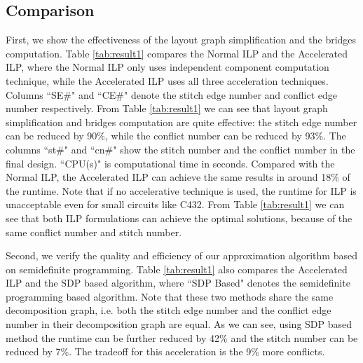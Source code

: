 \documentclass[10pt,conference]{IEEEtran}
\begin{document}
\subsection{Comparison}

First, we show the effectiveness of the layout graph simplification and the bridges computation.
Table \ref{tab:result1} compares the Normal ILP and the Accelerated ILP, where the Normal ILP only uses independent component computation technique, while the Accelerated ILP uses all three acceleration techniques.
Columns ``SE\#" and ``CE\#" denote the stitch edge number and conflict edge number respectively.
From Table \ref{tab:result1} we can see that layout graph simplification and bridges computation are quite effective:
the stitch edge number can be reduced by 90\%, while the conflict number can be reduced by 93\%.
The columns ``st\#" and  ``cn\#" show the stitch number and the conflict number in the final design.
``CPU(s)" is computational time in seconds.
Compared with the Normal ILP, the Accelerated ILP can achieve the same results in around 18\% of the runtime.
Note that if no accelerative technique is used, the runtime for ILP is unacceptable even for small circuits like C432. 
From Table \ref{tab:result1} we can see that both ILP formulations can achieve the optimal solutions, because of the same conflict number and stitch number. 

Second, we verify the quality and efficiency of our approximation algorithm based on semidefinite programming.
Table \ref{tab:result1} also compares the Accelerated ILP and the SDP based algorithm, where ``SDP Based" denotes the semidefinite programming based algorithm.
Note that these two methods share the same decomposition graph, i.e. both the stitch edge number and the conflict edge number in their decomposition graph are equal.
As we can see, using SDP based method the runtime can be further reduced by 42\% and the stitch number can be reduced by 7\%.
The tradeoff for this acceleration is the 9\% more conflicts.
\end{document}
